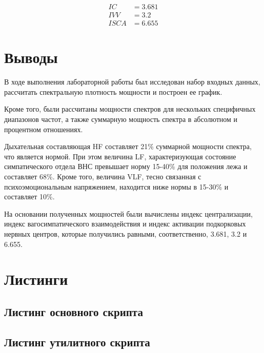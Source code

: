 \begin{align*}
    IC &= 3.681 \\
    IVV &= 3.2 \\
    ISCA &= 6.655
\end{align*}

\clearpage

\section*{Выводы}

В ходе выполнения лабораторной работы был исследован набор входных данных, рассчитать спектральную плотность мощности
и построен ее график.

Кроме того, были рассчитаны мощности спектров для нескольких специфичных диапазонов частот, а также
суммарную мощность спектра в абсолютном и процентном отношениях.

Дыхательная составляющая HF составляет 21\% суммарной мощности спектра, что является нормой.
При этом величина LF, характеризующая состояние симпатического отдела ВНС превышает норму 15-40\% для положения лежа
и составляет 68\%.
Кроме того, величина VLF, тесно связанная с психоэмоциональным напряжением, находится ниже нормы в 15-30\% и
составляет 10\%.

На основании полученных мощностей были вычислены индекс централизации, индекс вагосимпатического
взаимодействия и индекс активации подкорковых нервных центров, которые получились равными, соответственно, 3.681,
3.2 и 6.655.

\clearpage

\section*{Листинги}

\subsection*{Листинг основного скрипта}


\subsection*{Листинг утилитного скрипта}

